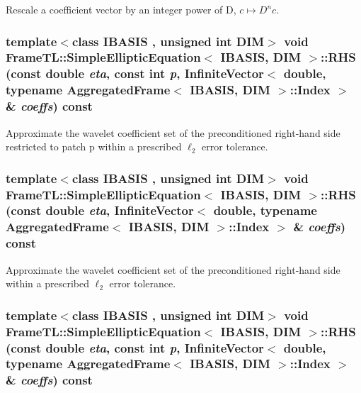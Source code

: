 Rescale a coefficient vector by an integer power of D, $c \mapsto D^{n}c$. \hypertarget{classFrameTL_1_1SimpleEllipticEquation_df01a8cf6b82866368e5c584a1fbbfa5}{
\subsubsection[{RHS}]{\setlength{\rightskip}{0pt plus 5cm}template$<$class IBASIS , unsigned int DIM$>$ void {\bf FrameTL::SimpleEllipticEquation}$<$ IBASIS, DIM $>$::RHS (const double {\em eta}, \/  const int {\em p}, \/  InfiniteVector$<$ double, typename {\bf AggregatedFrame}$<$ IBASIS, DIM $>$::{\bf Index} $>$ \& {\em coeffs}) const}}
\label{classFrameTL_1_1SimpleEllipticEquation_df01a8cf6b82866368e5c584a1fbbfa5}


Approximate the wavelet coefficient set of the preconditioned right-hand side restricted to patch p within a prescribed $\ell_2$ error tolerance. \hypertarget{classFrameTL_1_1SimpleEllipticEquation_2062b30008f73db23fa8b7415016ca00}{
\subsubsection[{RHS}]{\setlength{\rightskip}{0pt plus 5cm}template$<$class IBASIS , unsigned int DIM$>$ void {\bf FrameTL::SimpleEllipticEquation}$<$ IBASIS, DIM $>$::RHS (const double {\em eta}, \/  InfiniteVector$<$ double, typename {\bf AggregatedFrame}$<$ IBASIS, DIM $>$::{\bf Index} $>$ \& {\em coeffs}) const}}
\label{classFrameTL_1_1SimpleEllipticEquation_2062b30008f73db23fa8b7415016ca00}


Approximate the wavelet coefficient set of the preconditioned right-hand side within a prescribed $\ell_2$ error tolerance. \hypertarget{classFrameTL_1_1SimpleEllipticEquation_df01a8cf6b82866368e5c584a1fbbfa5}{
\subsubsection[{RHS}]{\setlength{\rightskip}{0pt plus 5cm}template$<$class IBASIS , unsigned int DIM$>$ void {\bf FrameTL::SimpleEllipticEquation}$<$ IBASIS, DIM $>$::RHS (const double {\em eta}, \/  const int {\em p}, \/  InfiniteVector$<$ double, typename {\bf AggregatedFrame}$<$ IBASIS, DIM $>$::{\bf Index} $>$ \& {\em coeffs}) const}}
\label{classFrameTL_1_1SimpleEllipticEquation_df01a8cf6b82866368e5c584a1fbbfa5}


